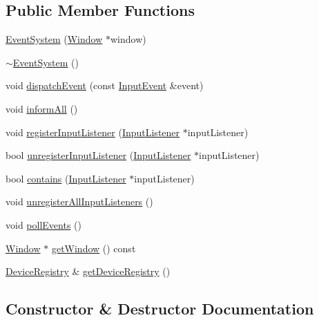 \subsection*{Public Member Functions}
\begin{DoxyCompactItemize}
\item 
\mbox{\hyperlink{classec_1_1_event_system_aebdeca9447afa113154fb2bab35c274c}{Event\+System}} (\mbox{\hyperlink{classec_1_1_window}{Window}} $\ast$window)
\item 
\mbox{\hyperlink{classec_1_1_event_system_ab67b98ebb182137fb1f380ee5289d1e8}{$\sim$\+Event\+System}} ()
\item 
void \mbox{\hyperlink{classec_1_1_event_system_a97cde1bf5a2f1f8e5982b4d9e5e62187}{dispatch\+Event}} (const \mbox{\hyperlink{structec_1_1_input_event}{Input\+Event}} \&event)
\item 
void \mbox{\hyperlink{classec_1_1_event_system_a45e41343c01e736a818c642696140632}{inform\+All}} ()
\item 
void \mbox{\hyperlink{classec_1_1_event_system_a179422c96238019204eccd00f8662c01}{register\+Input\+Listener}} (\mbox{\hyperlink{classec_1_1_input_listener}{Input\+Listener}} $\ast$input\+Listener)
\item 
bool \mbox{\hyperlink{classec_1_1_event_system_a6b76350de7e412e8df412b8c5bfd5b03}{unregister\+Input\+Listener}} (\mbox{\hyperlink{classec_1_1_input_listener}{Input\+Listener}} $\ast$input\+Listener)
\item 
bool \mbox{\hyperlink{classec_1_1_event_system_a0df83c331a79a7dfdaa9e48920d24c9f}{contains}} (\mbox{\hyperlink{classec_1_1_input_listener}{Input\+Listener}} $\ast$input\+Listener)
\item 
void \mbox{\hyperlink{classec_1_1_event_system_a142264d74594a6584fd06a00eec45345}{unregister\+All\+Input\+Listeners}} ()
\item 
void \mbox{\hyperlink{classec_1_1_event_system_a547dbafa5aa6f770c8a839d81a369ea6}{poll\+Events}} ()
\item 
\mbox{\hyperlink{classec_1_1_window}{Window}} $\ast$ \mbox{\hyperlink{classec_1_1_event_system_a49289b02be391da14f42cef7bbb63fc3}{get\+Window}} () const
\item 
\mbox{\hyperlink{classec_1_1_device_registry}{Device\+Registry}} \& \mbox{\hyperlink{classec_1_1_event_system_a8c84a98e39be4a735dc882e19e4b309a}{get\+Device\+Registry}} ()
\end{DoxyCompactItemize}


\subsection{Constructor \& Destructor Documentation}
\mbox{\label{classec_1_1_event_system_aebdeca9447afa113154fb2bab35c274c}} 
